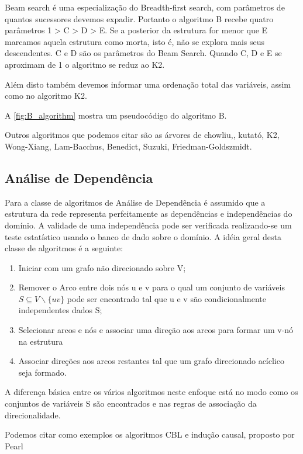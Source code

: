 Beam search é uma especialização do Breadth-first search, com parâmetros de quantos sucessores devemos expadir. Portanto o algoritmo B recebe quatro parâmetros 1 > C > D > E. Se a posterior da estrutura for menor que E marcamos aquela estrutura como morta, isto é, não se explora mais seus descendentes. C e D são os parâmetros do Beam Search. Quando C, D e E se aproximam de 1 o algoritmo se reduz ao K2.

Além disto também devemos informar uma ordenação total das variáveis, assim como no algoritmo K2.

A \autoref{fig:B_algorithm} mostra um pseudocódigo do algoritmo B.

Outros algoritmos que podemos citar são as árvores de chowliu\cite{chow68},, kutató\cite{kutato13}, K2, Wong-Xiang\cite{wong94}, Lam-Bacchus\cite{lam94}, Benedict\cite{benedict96}, Suzuki\cite{suzuki96}, Friedman-Goldszmidt\cite{friedman97}.
\subsection{Análise de Dependência}
Para a classe de algoritmos de Análise de Dependência é assumido que a estrutura da rede representa perfeitamente as dependências e independências do domínio. A validade de uma independência pode ser verificada realizando-se um teste estatístico usando o banco de dado sobre o domínio. A idéia geral desta classe de algoritmos é a seguinte:

\begin{enumerate}
	\item Iniciar com um grafo não direcionado sobre V;
	\item Remover o Arco entre dois nós u e v para o qual um conjunto de variáveis $S \subseteq V\backslash \{uv\} $ pode ser encontrado tal que u e v são condicionalmente independentes dados S;
	\item Selecionar arcos e nós e associar uma direção aos arcos para formar um v-nó na estrutura
	\item Associar direções aos arcos restantes tal que um grafo direcionado acíclico seja formado.
\end{enumerate}
A diferença básica entre os vários algoritmos neste enfoque está no modo como os conjuntos de variáveis S são encontrados e nas regras de associação da direcionalidade.

Podemos citar como exemplos os algoritmos CBL \cite{cbl98} e indução causal, proposto por Pearl \cite{pearl91}



